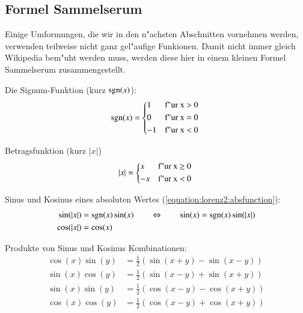 \subsection{Formel Sammelserum}
Einige Umformungen, die wir in den n"achsten Abschnitten vornehmen werden, 
verwenden teilweise nicht ganz gel"aufige Funkionen. Damit nicht immer gleich 
Wikipedia bem"uht werden muss, werden diese hier in einem kleinen 
Formel Sammelserum zusammengestellt.

Die Signum-Funktion (kurz $\sgn(x)$):
\begin{equation}
\sgn(x) =
\begin{cases*}
1 & f"ur x > 0 \\
0 & f"ur x = 0 \\
-1 & f"ur x < 0
\end{cases*}
\label{equation:lorenz2:signum}
\end{equation}

Betragsfunktion (kurz $|x|$)
\begin{equation}
|x| =
\begin{cases*}
x & f"ur x $\geq$ 0 \\
-x & f"ur x < 0
\end{cases*}
\label{equation:lorenz2:absfunction}
\end{equation}

Sinus und Kosinus eines absoluten Wertes (\cref{equation:lorenz2:absfunction}):
\begin{equation}
\begin{split}
\sin(|x|) &= \sgn(x)\sin(x) \qquad \Leftrightarrow \qquad \sin(x) = 
\sgn(x)\sin(|x|)
\\
\cos(|x|) &= \cos(x)
\end{split}
\label{equation:lorenz2:sincosabs}
\end{equation}

Produkte von Sinus und Kosinus Kombinationen:
\begin{align*}
\cos(x)\sin(y) &= \frac{1}{2} \left(\sin(x + y) - \sin(x - y)\right)
\\
\sin(x)\cos(y) &= \frac{1}{2} \left(\sin(x - y) + \sin(x + y)\right)
\\
\sin(x)\sin(y) &= \frac{1}{2} \left(\cos(x - y) - \cos(x + y)\right)
\\
\cos(x)\cos(y) &= \frac{1}{2} \left(\cos(x - y) + \cos(x + y)\right)
\end{align*}
